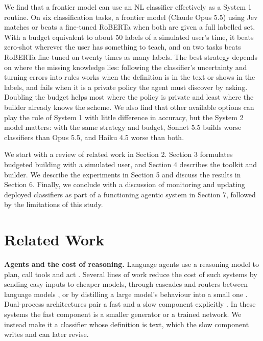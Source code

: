 \documentclass[11pt]{article}
\begin{document}
We find that a frontier model can use an NL classifier effectively as a System 1 routine. On six classification tasks, a frontier model (Claude Opus 5.5) using Jev matches or beats a fine-tuned RoBERTa when both are given a full labelled set. With a budget equivalent to about 50 labels of a simulated user's time, it beats zero-shot wherever the user has something to teach, and on two tasks beats RoBERTa fine-tuned on twenty times as many labels. The best strategy depends on where the missing knowledge lies: following the classifier's uncertainty and turning errors into rules works when the definition is in the text or shows in the labels, and fails when it is a private policy the agent must discover by asking. Doubling the budget helps most where the policy is private and least where the builder already knows the scheme. We also find that other available options can play the role of System 1 with little difference in accuracy, but the System 2 model matters: with the same strategy and budget, Sonnet 5.5 builds worse classifiers than Opus 5.5, and Haiku 4.5 worse than both.

We start with a review of related work in Section 2. Section 3 formulates budgeted building with a simulated user, and Section 4 describes the toolkit and builder. We describe the experiments in Section 5 and discuss the results in Section 6. Finally, we conclude with a discussion of monitoring and updating deployed classifiers as part of a functioning agentic system in Section 7, followed by the limitations of this study.

\section{Related Work}

\textbf{Agents and the cost of reasoning.} Language agents use a reasoning model to plan, call tools and act \citep{yao2023react,schick2023toolformer,wang2024survey}. Several lines of work reduce the cost of such systems by sending easy inputs to cheaper models, through cascades and routers between language models \citep{chen2023frugalgpt,ong2024routellm}, or by distilling a large model's behaviour into a small one \citep{hsieh2023distilling}. Dual-process architectures pair a fast and a slow component explicitly \citep{bengio2019system2,booch2021thinking,lin2023swiftsage}. In these systems the fast component is a smaller generator or a trained network. We instead make it a classifier whose definition is text, which the slow component writes and can later revise.
\end{document}
